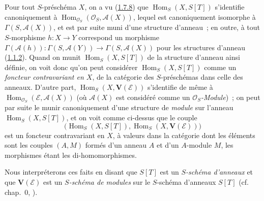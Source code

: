 \begin{env}[1.7.13]
\label{II.1.7.13-fr}
Pour tout $S$-préschéma $X$, on a vu
(\hyperref[II.1.7.8-fr]{1.7.8}) que
$\operatorname{Hom}_S(X,S[T])$ s'identifie canoniquement à
$\operatorname{Hom}_{\mathcal{O}_S}(\mathcal{O}_S,\mathcal{A}(X))$, lequel
est canoniquement isomorphe à $\Gamma(S,\mathcal{A}(X))$, et est par suite
muni d'une structure d'anneau~; en outre, à tout $S$-morphisme $h:X\to Y$
correspond un morphisme
$\Gamma(\mathcal{A}(h)):\Gamma(S,\mathcal{A}(Y))
\to\Gamma(S,\mathcal{A}(X))$ pour les structures d'anneau
(\hyperref[II.1.1.2-fr]{1.1.2}). Quand on munit
$\operatorname{Hom}_S(X,S[T])$ de la structure d'anneau ainsi définie, on
voit donc qu'on peut considérer $\operatorname{Hom}_S(X,S[T])$ comme un
\emph{foncteur contravariant en $X$}, de la catégorie des $S$-préschémas
dans celle des anneaux. D'autre part,
$\operatorname{Hom}_S(X,\mathbf{V}(\mathcal{E}))$ s'identifie de même à
$\operatorname{Hom}_{\mathcal{O}_S}(\mathcal{E},\mathcal{A}(X))$ (où
$\mathcal{A}(X)$ est considéré comme un
\emph{$\mathcal{O}_S$-Module})~; on peut par suite le munir canoniquement
d'une structure de \emph{module} sur l'anneau
$\operatorname{Hom}_S(X,S[T])$, et on voit comme ci-dessus que le couple
\[
  \bigl(\operatorname{Hom}_S(X,S[T]),
  \operatorname{Hom}_S(X,\mathbf{V}(\mathcal{E}))\bigr)
\]
est un foncteur contravariant en $X$, à valeurs dans la catégorie dont les
éléments sont les couples $(A,M)$ formés d'un anneau $A$ et d'un $A$-module
$M$, les morphismes étant les di-homomorphismes.

Nous interpréterons ces faits en disant que $S[T]$ est un
\emph{$S$-schéma d'anneaux} et que $\mathbf{V}(\mathcal{E})$ est un
\emph{$S$-schéma de modules} sur le $S$-schéma d'anneaux $S[T]$
(cf. chap.~0, ).
\end{env}

